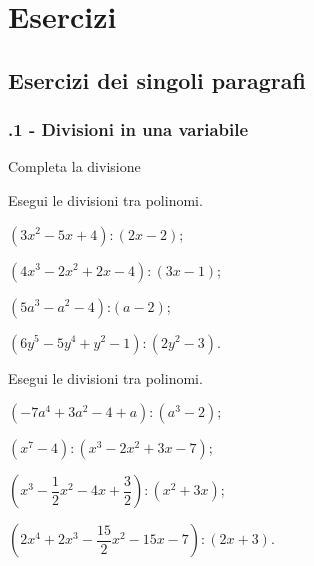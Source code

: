 
\section{Esercizi}
\subsection{Esercizi dei singoli paragrafi}
\subsubsection*{\thechapter.1 - Divisioni in una variabile}

\begin{esercizio}
\label{ese:12.1}
Completa la divisione
\begin{center}
 
\end{center}
\end{esercizio}

\begin{esercizio}[\Ast]
\label{ese:12.2}
Esegui le divisioni tra polinomi.
 \begin{enumeratea}
 \item $\left(3x^{2}-5x+4\right):\left(2x-2\right)$;
 \item $\left(4x^{3}-2x^{2}+2x-4\right):\left(3x-1\right)$;
 \item $\left(5a^{3}-a^{2}-4\right)\text{:}\left(a-2\right)$;
 \item $\left(6y^{5}-5y^{4}+y^{2}-1\right):\left(2y^{2}-3\right)$.
 \end{enumeratea}
\end{esercizio}

\begin{esercizio}[\Ast]
\label{ese:12.3}
Esegui le divisioni tra polinomi.
 \begin{enumeratea}
 \item $\left(-7a^{4}+3a^{2}-4+a\right):\left(a^{3}-2\right)$;
 \item $\left(x^{7}-4\right):\left(x^{3}-2x^{2}+3x-7\right)$;
 \item $\left(x^{3}-\dfrac{1}{2}x^{2}-4x+\dfrac{3}{2}\right):\left(x^{2}+3x\right)$;
 \item $\left(2x^{4}+2x^{3}-\dfrac{15}{2}x^{2}-15x-7\right):(2x+3)$.
 \end{enumeratea}
\end{esercizio}

